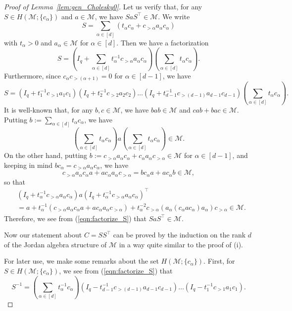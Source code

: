 \documentclass[12pt]{amsart}
\theoremstyle{plain}
\theoremstyle{definition}
\theoremstyle{remark}
\newcommand{\1}{\mathbf{1}}
\newcommand{\mytransp}[1]{ #1^{\top}}
\begin{document}
\begin{proof}[Proof of Lemma~\ref{lem:gen_Cholesky0}]
Let us verify that, 
 for any $S \in H(\mathcal{M}; \{c_\alpha\})$ and $a \in \mathcal{M}$,
 we have $S a \mytransp{S} \in \mathcal{M}$.
We write
$$ S = \sum_{\alpha \in [d]} (t_\alpha c_{\alpha} + c_{>\alpha} a_\alpha c_\alpha ) $$
 with $t_\alpha > 0$ and $a_\alpha \in \mathcal{M}$ for $\alpha \in [d]$.
Then we have a factorization
$$
 S = (I_q + \sum_{\alpha \in [d]} t_\alpha^{-1} c_{> \alpha} a_\alpha c_\alpha) (\sum_{\alpha \in [d]} t_\alpha c_\alpha).
$$
Furthermore,
 since $c_{\alpha} c_{>(\alpha+1)}= 0$ for $\alpha \in [d-1]$, 
 we have
 \begin{equation} \label{eqn:factorize_S}
 S = (I_q + t_1^{-1} c_{>1} a_1 c_1) (I_q + t_2^{-1} c_{>2} a_2 c_2) \dots (I_q + t_{d-1}^{-1} c_{>(d-1)} a_{d-1} c_{d-1}) 
 (\sum_{\alpha  \in [d]} t_\alpha c_\alpha).  
 \end{equation}
It is well-known that, 
 for any $b,c \in \mathcal{M}$, 
 we have $bab \in \mathcal{M}$ and $cab + bac \in \mathcal{M}$.
Putting $b := \sum_{\alpha  \in [d]} t_\alpha c_\alpha$,
  we have
 $$ (\sum_{\alpha  \in [d]} t_\alpha c_\alpha) a (\sum_{\alpha  \in [d]} t_\alpha c_\alpha) \in \mathcal{M}.$$
On the other hand, 
 putting $b := c_{>\alpha} a_\alpha c_\alpha + c_\alpha a_\alpha c_{>\alpha} \in \mathcal{M}$ for $\alpha \in [d-1]$,
 and keeping in mind $b c_\alpha = c_{>\alpha} a_\alpha c_\alpha$, 
 we have
 $$
 c_{>\alpha} a_\alpha c_\alpha a + a c_\alpha a_\alpha c_{>\alpha} = b c_\alpha a + a c_\alpha b \in \mathcal{M},
 $$
 so that
  \begin{align*}
 {} &  (I_q + t_{\alpha}^{-1}c_{>\alpha} a_\alpha c_\alpha) a \mytransp{(I_q + t_\alpha^{-1}c_{>\alpha} a_\alpha c_\alpha)}\\
  &= a + t_{\alpha}^{-1}(c_{>\alpha} a_\alpha c_\alpha a + a c_\alpha a_\alpha c_{>\alpha}) 
  + t_{\alpha}^{-2} c_{>\alpha} (a_\alpha (c_\alpha a c_\alpha) a_\alpha) c_{>\alpha} \in \mathcal{M}.
  \end{align*}
Therefore, 
 we see from (\ref{eqn:factorize_S}) that
 $S a \mytransp{S} \in \mathcal{M}$.
 
 Now our statement about $C = S \mytransp{S}$
 can be proved 
 by the induction on the rank $d$ of the Jordan algebra structure of $\mathcal{M}$
 in a way quite similar to the proof of (i).
 

For later use, 
 we make some remarks about the set $H(\mathcal{M}; \{ c_\alpha \})$.
First, 
 for $S \in H(\mathcal{M}; \{ c_\alpha \})$, 
 we see from (\ref{eqn:factorize_S}) that
 \begin{equation} \label{eqn:S_inverse}
 S^{-1} 
 = (\sum_{\alpha \in [d]} t_\alpha^{-1} c_\alpha)
   (I_q - t_{d-1}^{-1} c_{>(d-1)}a_{d-1} c_{d-1}) \dots (I_q - t_1^{-1} c_{>1} a_1 c_1).
 \end{equation}


\end{proof}
\end{document}
